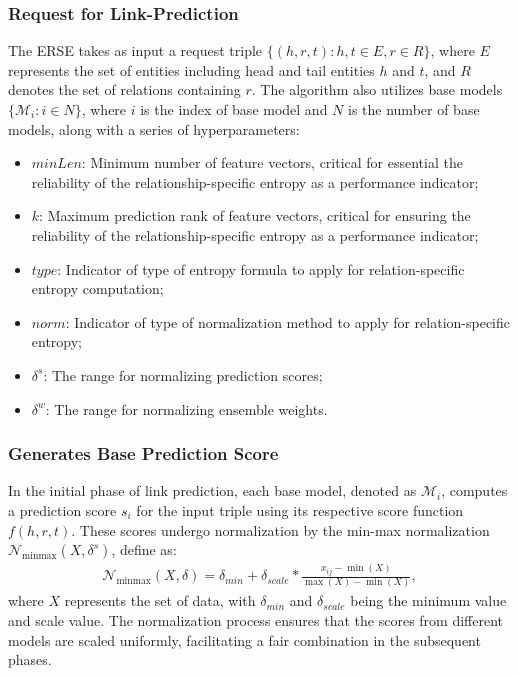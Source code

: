 \documentclass{article}
\begin{document}
\subsubsection{Request for Link-Prediction}

The ERSE takes as input a request triple $\{(h, r, t) : h, t \in E, r \in R\}$, where $E$ represents the set of entities including head and tail entities $h$ and $t$, and $R$ denotes the set of relations containing $r$. The algorithm also utilizes base models $\{\mathcal{M}_i : i \in N\}$, where $i$ is the index of base model and $N$ is the number of base models, along with a series of hyperparameters: 
\begin{itemize}
    \item $minLen$: Minimum number of feature vectors, critical for essential the reliability of the relationship-specific entropy as a performance indicator;
    \item $k$: Maximum prediction rank of feature vectors, critical for ensuring the reliability of the relationship-specific entropy as a performance indicator;
    \item $type$: Indicator of type of entropy formula to apply for relation-specific entropy computation;
    \item $norm$: Indicator of type of normalization method to apply for relation-specific entropy;
    \item $\delta^s$: The range for normalizing prediction scores;
    \item $\delta^w$: The range for normalizing ensemble weights.
\end{itemize}


\subsubsection{Generates Base Prediction Score}
In the initial phase of link prediction, each base model, denoted as $\mathcal{M}_i$, computes a prediction score $s\acute{}_i$ for the input triple using its respective score function $f(h,r,t)$. These scores undergo normalization by the min-max normalization $\mathcal{N}_{\text{minmax}}(X, \delta^s)$, define as: 
\begin{align}
\label{eq:NormMM}
    \mathcal{N}_{\text{minmax}}(X, \delta) = \delta_{min} + \delta_{scale}*\frac{x_{ij} - \min(X)}{\max(X) - \min(X)},
\end{align}%
where $X$ represents the set of data, with $\delta_{min}$ and $\delta_{scale}$ being the minimum value and scale value. The normalization process ensures that the scores from different models are scaled uniformly, facilitating a fair combination in the subsequent phases.
\\
\end{document}
